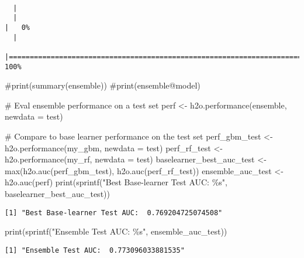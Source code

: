 \documentclass[
  letterpaper,
  DIV=11,
  numbers=noendperiod]{scrartcl}
\newenvironment{Shaded}{\begin{snugshade}}{\end{snugshade}}
\newcommand{\AttributeTok}[1]{\textcolor[rgb]{0.40,0.45,0.13}{#1}}
\newcommand{\CommentTok}[1]{\textcolor[rgb]{0.37,0.37,0.37}{#1}}
\newcommand{\FunctionTok}[1]{\textcolor[rgb]{0.28,0.35,0.67}{#1}}
\newcommand{\NormalTok}[1]{\textcolor[rgb]{0.00,0.23,0.31}{#1}}
\newcommand{\OtherTok}[1]{\textcolor[rgb]{0.00,0.23,0.31}{#1}}
\newcommand{\StringTok}[1]{\textcolor[rgb]{0.13,0.47,0.30}{#1}}
\begin{document}
\begin{verbatim}

  |                                                                            
  |                                                                      |   0%
  |                                                                            
  |======================================================================| 100%
\end{verbatim}

\begin{Shaded}
\begin{Highlighting}[]
\CommentTok{\#print(summary(ensemble))}
\CommentTok{\#print(ensemble@model)}

\CommentTok{\# Eval ensemble performance on a test set}
\NormalTok{perf }\OtherTok{\textless{}{-}} \FunctionTok{h2o.performance}\NormalTok{(ensemble, }\AttributeTok{newdata =}\NormalTok{ test)}

\CommentTok{\# Compare to base learner performance on the test set}
\NormalTok{perf\_gbm\_test }\OtherTok{\textless{}{-}} \FunctionTok{h2o.performance}\NormalTok{(my\_gbm, }\AttributeTok{newdata =}\NormalTok{ test)}
\NormalTok{perf\_rf\_test }\OtherTok{\textless{}{-}} \FunctionTok{h2o.performance}\NormalTok{(my\_rf, }\AttributeTok{newdata =}\NormalTok{ test)}
\NormalTok{baselearner\_best\_auc\_test }\OtherTok{\textless{}{-}} \FunctionTok{max}\NormalTok{(}\FunctionTok{h2o.auc}\NormalTok{(perf\_gbm\_test), }\FunctionTok{h2o.auc}\NormalTok{(perf\_rf\_test))}
\NormalTok{ensemble\_auc\_test }\OtherTok{\textless{}{-}} \FunctionTok{h2o.auc}\NormalTok{(perf)}
\FunctionTok{print}\NormalTok{(}\FunctionTok{sprintf}\NormalTok{(}\StringTok{"Best Base{-}learner Test AUC:  \%s"}\NormalTok{, baselearner\_best\_auc\_test))}
\end{Highlighting}
\end{Shaded}

\begin{verbatim}
[1] "Best Base-learner Test AUC:  0.769204725074508"
\end{verbatim}

\begin{Shaded}
\begin{Highlighting}[]
\FunctionTok{print}\NormalTok{(}\FunctionTok{sprintf}\NormalTok{(}\StringTok{"Ensemble Test AUC:  \%s"}\NormalTok{, ensemble\_auc\_test))}
\end{Highlighting}
\end{Shaded}

\begin{verbatim}
[1] "Ensemble Test AUC:  0.773096033881535"
\end{verbatim}
\end{document}

